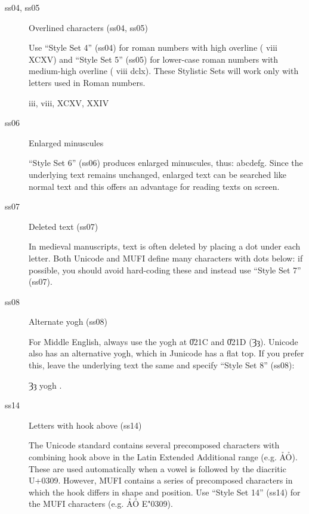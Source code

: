 \begin{description}
\item[ss04, ss05] Overlined characters (ss04, ss05)

Use “Style Set 4” (ss04) for roman numbers with high overline
({ viii XCXV}) and “Style Set 5”
(ss05) for lower-case roman numbers with medium-high overline
({ viii dclx}). These Stylistic
Sets will work only with letters used in Roman numbers.

\begin{codeexample}[vbox]
 iii, viii, XCXV, XXIV
\end{codeexample}

\item [ss06] Enlarged minuscules

“Style Set 6” (ss06) produces enlarged minuscules, thus:
{ abcdefg.} Since the underlying
text remains unchanged, enlarged text can be searched like normal
text and this offers an advantage for reading texts on screen.

\item[ss07] Deleted text (ss07)

In medieval manuscripts, text is often deleted by placing a dot under each
letter. Both Unicode and MUFI define many characters with dots below:
{ if possible, you should avoid
hard-coding these and instead use} “Style Set 7” (ss07).

\item[ss08] Alternate yogh (ss08)

For Middle English, always use the yogh at \U{021C} and \U{021D}  (Ȝȝ).
Unicode also has an alternative yogh, which in Junicode has a
flat top. If you prefer this, leave the underlying text the same and
specify “Style Set 8” (ss08):

{
   Ȝȝ yogh 
  \alphabet
}.


\item[ss14] Letters with hook above (ss14)

The Unicode standard contains several precomposed characters with
combining hook above in the Latin Extended Additional range
(e.g. ẢỎ). These are used automatically when a vowel is followed by
the diacritic U+0309. However, MUFI contains a series of precomposed
characters in which the hook differs in shape and position. Use “Style
Set 14” (ss14) for the MUFI characters (e.g.
ẢỎ E\char"0309).


\end{description}
